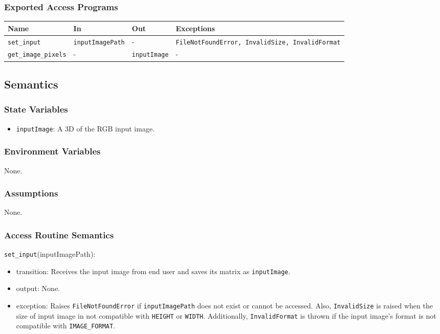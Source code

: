 \documentclass[12pt, titlepage]{article}
\def\code#1{\texttt{#1}}
\begin{document}
\subsubsection{Exported Access Programs}

\begin{center}
\begin{tabular}{p{3.5cm} p{4cm} p{4cm} p{4cm}}
\hline
\textbf{Name} & \textbf{In} & \textbf{Out} & \textbf{Exceptions} \\
\hline
\code{set\_input} & \code{inputImagePath} & - & \code{FileNotFoundError, InvalidSize, InvalidFormat} \\
\code{get\_image\_pixels} & - & \code{inputImage} & - \\
\hline
\end{tabular}
\end{center}

\subsection{Semantics}

\subsubsection{State Variables}
\begin{itemize}
  \item \code{inputImage}: A 3D of the RGB input image.
\end{itemize}

\subsubsection{Environment Variables}
None.

\subsubsection{Assumptions}
None.

\subsubsection{Access Routine Semantics}

\noindent \code{set\_input}(inputImagePath):
\begin{itemize}
  \item transition: Receives the input image from end user and saves its matrix as \code{inputImage}.
  \item output: None.
  \item exception: Raises \code{FileNotFoundError} if \code{inputImagePath} does not exist or cannot be accessed. 
  Also, \code{InvalidSize} is raised when the size of input image in not compatible with \code{HEIGHT} or 
  \code{WIDTH}. Additionally, \code{InvalidFormat} is thrown if the input image's format is 
  not compatible with \code{IMAGE\_FORMAT}.
\end{itemize}
\end{document}
